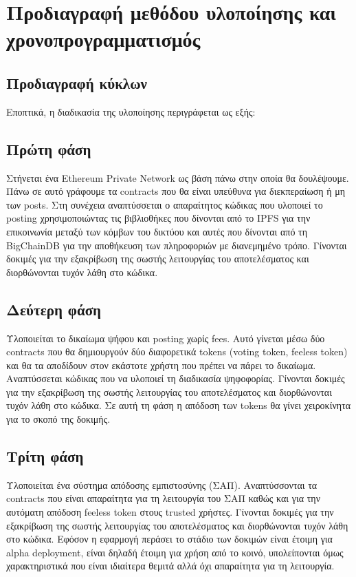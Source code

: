 \section{Προδιαγραφή μεθόδου υλοποίησης και χρονοπρογραμματισμός}

\subsection{Προδιαγραφή κύκλων}

Εποπτικά, η διαδικασία της υλοποίησης περιγράφεται ως εξής:


\subsection{Πρώτη φάση}

Στήνεται ένα Ethereum Private Network ως βάση πάνω στην οποία θα δουλέψουμε. Πάνω σε αυτό γράφουμε τα contracts που θα είναι υπεύθυνα για διεκπεραίωση ή μη των posts.
Στη συνέχεια αναπτύσσεται ο απαραίτητος κώδικας που υλοποιεί το posting χρησιμοποιώντας τις βιβλιοθήκες που δίνονται από το IPFS για την επικοινωνία μεταξύ των κόμβων του δικτύου και αυτές που δίνονται από τη BigChainDB για την αποθήκευση των πληροφοριών με διανεμημένο τρόπο.
Γίνονται δοκιμές για την εξακρίβωση της σωστής λειτουργίας του αποτελέσματος και διορθώνονται τυχόν λάθη στο κώδικα.

\subsection{Δεύτερη φάση}

Υλοποιείται το δικαίωμα ψήφου και posting χωρίς fees. Αυτό γίνεται μέσω δύο contracts που θα δημιουργούν δύο διαφορετικά tokens (voting token, feeless token) και θα τα αποδίδουν στον εκάστοτε χρήστη που πρέπει να πάρει το δικαίωμα.
Αναπτύσσεται κώδικας που να υλοποιεί τη διαδικασία ψηφοφορίας.
Γίνονται δοκιμές για την εξακρίβωση της σωστής λειτουργίας του αποτελέσματος και διορθώνονται τυχόν λάθη στο κώδικα. Σε αυτή τη φάση η απόδοση των tokens θα γίνει χειροκίνητα για το σκοπό της δοκιμής.

\subsection{Τρίτη φάση}

Υλοποιείται ένα σύστημα απόδοσης εμπιστοσύνης (ΣΑΠ).
Αναπτύσσονται τα contracts που είναι απαραίτητα για τη λειτουργία του ΣΑΠ καθώς και για την αυτόματη απόδοση feeless token στους trusted χρήστες.
Γίνονται δοκιμές για την εξακρίβωση της σωστής λειτουργίας του αποτελέσματος και διορθώνονται τυχόν λάθη στο κώδικα.
Εφόσον η εφαρμογή περάσει το στάδιο των δοκιμών είναι έτοιμη για alpha deployment, είναι δηλαδή έτοιμη για χρήση από το κοινό, υπολείπονται όμως χαρακτηριστικά που είναι ιδιαίτερα θεμιτά αλλά όχι απαραίτητα για τη λειτουργία.

